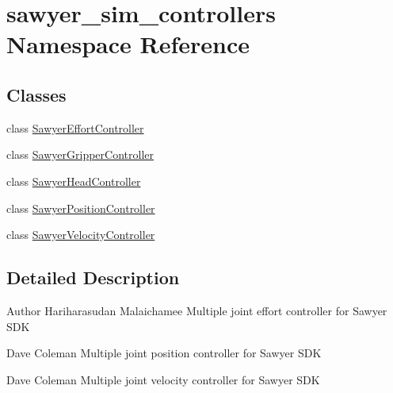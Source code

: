\hypertarget{namespacesawyer__sim__controllers}{\section{sawyer\-\_\-sim\-\_\-controllers Namespace Reference}
\label{namespacesawyer__sim__controllers}
}
\subsection*{Classes}
\begin{DoxyCompactItemize}
\item 
class \hyperlink{classsawyer__sim__controllers_1_1_sawyer_effort_controller}{Sawyer\-Effort\-Controller}
\item 
class \hyperlink{classsawyer__sim__controllers_1_1_sawyer_gripper_controller}{Sawyer\-Gripper\-Controller}
\item 
class \hyperlink{classsawyer__sim__controllers_1_1_sawyer_head_controller}{Sawyer\-Head\-Controller}
\item 
class \hyperlink{classsawyer__sim__controllers_1_1_sawyer_position_controller}{Sawyer\-Position\-Controller}
\item 
class \hyperlink{classsawyer__sim__controllers_1_1_sawyer_velocity_controller}{Sawyer\-Velocity\-Controller}
\end{DoxyCompactItemize}


\subsection{Detailed Description}
\begin{DoxyAuthor}{Author}
Hariharasudan Malaichamee  Multiple joint effort controller for Sawyer S\-D\-K

Dave Coleman  Multiple joint position controller for Sawyer S\-D\-K

Dave Coleman  Multiple joint velocity controller for Sawyer S\-D\-K 
\end{DoxyAuthor}
